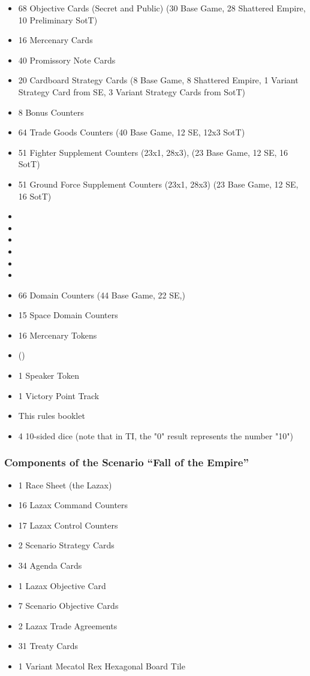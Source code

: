 \documentclass[11pt,fleqn]{book} %
\begin{document}
\begin{itemize}
\item 68 Objective Cards (Secret and Public) (30 Base Game, 28 Shattered Empire, 10 Preliminary SotT)
\item 16 Mercenary Cards
\item 40 Promissory Note Cards
\item 20 Cardboard Strategy Cards (8 Base Game, 8 Shattered Empire, 1 Variant Strategy Card from SE, 3 Variant Strategy Cards from SotT)
\item 8 Bonus Counters
\item 64 Trade Goods Counters (40 Base Game, 12 SE, 12x3 SotT)
\item 51 Fighter Supplement Counters (23x1, 28x3), (23 Base Game, 12 SE, 16 SotT)
\item 51 Ground Force Supplement Counters (23x1, 28x3) (23 Base Game, 12 SE, 16 SotT)
\item {}
\item {}
\item {}
\item {}
\item {}
\item {}
\item 66 Domain Counters (44 Base Game, 22 SE,)
\item 15 Space Domain Counters
\item 16 Mercenary Tokens
\item {} ()
\item 1 Speaker Token
\item 1 Victory Point Track
\item This rules booklet
\item 4 10-sided dice (note that in TI, the "0" result represents the number "10")
\end{itemize}

\begin{STbox}
\subsubsection{Components of the Scenario “Fall of the Empire”}
\begin{itemize}
\item 1 Race Sheet (the Lazax)
\item 16 Lazax Command Counters
\item 17 Lazax Control Counters
\item 2 Scenario Strategy Cards
\item 34 Agenda Cards
\item 1 Lazax Objective Card
\item 7 Scenario Objective Cards
\item 2 Lazax Trade Agreements
\item 31 Treaty Cards
\item 1 Variant Mecatol Rex Hexagonal Board Tile
\end{itemize}
\end{STbox}
\end{document}
